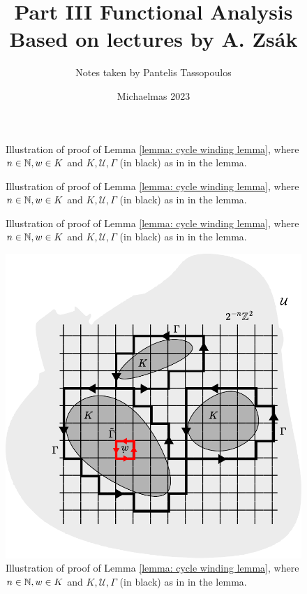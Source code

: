 \documentclass{article}
\title{\Huge Part III Functional Analysis \\ 
\huge Based on lectures by A. Zs\'{ak}}
\author{\Large Notes taken by Pantelis Tassopoulos}
\date{\Large Michaelmas 2023}
\begin{document}
\begin{figure}[H]
        \centering
        
        \caption{Illustration of proof of Lemma \ref{lemma: cycle winding lemma}, where $n\in \mathbb{N}, w\in K$ and $K, \mathcal{U}, \Gamma$ (in black) as in in the lemma.}
        \label{fig: proof of winding lemma}
    \end{figure}

\begin{figure}[H]
        \centering
        
        \caption{Illustration of proof of Lemma \ref{lemma: cycle winding lemma}, where $n\in \mathbb{N}, w\in K$ and $K, \mathcal{U}, \Gamma$ (in black) as in in the lemma.}
        \label{fig: proof of winding lemma}
    \end{figure}
\begin{figure}[H]
        \centering
        
        \caption{Illustration of proof of Lemma \ref{lemma: cycle winding lemma}, where $n\in \mathbb{N}, w\in K$ and $K, \mathcal{U}, \Gamma$ (in black) as in in the lemma.}
        \label{fig: proof of winding lemma}
    \end{figure}
\begin{figure}[H]
        \centering
        \includegraphics[width=\linewidth]{images/Cauchy lemma.pdf}
        \caption{Illustration of proof of Lemma \ref{lemma: cycle winding lemma}, where $n\in \mathbb{N}, w\in K$ and $K, \mathcal{U}, \Gamma$ (in black) as in in the lemma.}
        \label{fig: proof of winding lemma}
    \end{figure}
\end{document}
